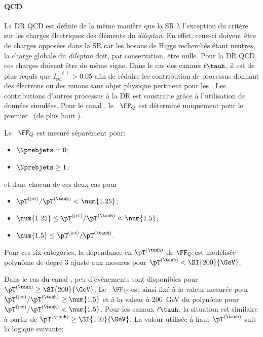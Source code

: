 \paragraph{QCD}
La DR QCD est définie de la même manière que la SR à l'exception du critère sur les charges électriques des éléments du \emph{dilepton}.
En effet, ceux-ci doivent être de charges opposées dans la SR car les bosons de Higgs recherchés étant neutres, la charge globale du \emph{dilepton} doit, par conservation, être nulle.
Pour la DR QCD, ces charges doivent être de même signe.
Dans le cas des canaux $\ell\tauh$, il est de plus requis que $I_\text{rel}^{(\ell)} > \num{0.05}$ afin de réduire les contribution de processus donnant des électrons ou des muons sans objet physique pertinent pour les \fakefactors.
Les contributions d'autres processus à la DR est soustraite grâce à l'utilisation de données simulées.
Pour le canal \tauh\tauh, le \fakefactor\ $\FF_Q$ est déterminé uniquement pour le premier \tauh\ (de plus haut \pT).
\par
Le \fakefactor\ $\FF_Q$ est mesuré séparément pour:
\begin{itemize}
\item $\Nprebjets=0$;
\item $\Nprebjets\geq1$;
\end{itemize}
et dans chacun de ces deux cas pour
\begin{itemize}
\item $\pT^{(\text{jet})}/\pT^{(\tauh)} < \num{1.25}$;
\item $\num{1.25} \leq \pT^{(\text{jet})}/\pT^{(\tauh)} < \num{1.5}$;
\item $\num{1.5} \leq \pT^{(\text{jet})}/\pT^{(\tauh)}$.
\end{itemize}
Pour ces six catégories, la dépendance en $\pT^{(\tauh)}$ de $\FF_Q$ est modélisée polynôme de degré 3 ajusté aux mesures pour $\pT^{(\tauh)}<\SI{200}{\GeV}$.
\par
Dans le cas du canal \tauh\tauh, peu d'événements sont disponibles pour $\pT^{(\tauh)}\geq\SI{200}{\GeV}$.
Le \fakefactor\ $\FF_Q$ est ainsi fixé à la valeur mesurée pour $\pT^{(\text{jet})}/\pT^{(\tauh)} \geq \num{1.5}$ et à la valeur à \SI{200}{\GeV} du polynôme pour $\pT^{(\text{jet})}/\pT^{(\tauh)} < \num{1.5}$.
Pour les canaux $\ell\tauh$, la situation est similaire à partir de $\pT^{(\tauh)}\geq\SI{140}{\GeV}$.
La valeur utilisée à haut $\pT^{(\tauh)}$ suit la logique suivante:
